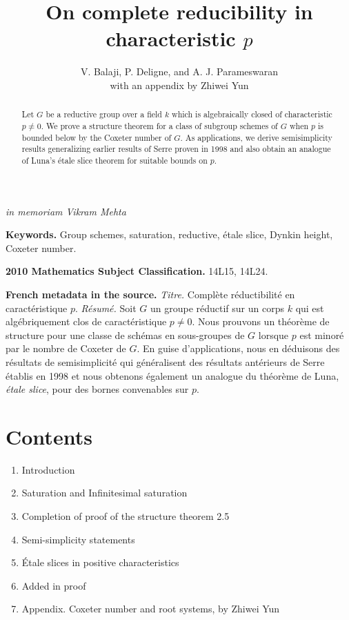 \documentclass[11pt]{article}
\title{On complete reducibility in characteristic \(p\)}
\author{V. Balaji, P. Deligne, and A. J. Parameswaran\\
\large with an appendix by Zhiwei Yun}
\date{}
\begin{document}
\maketitle

\begin{center}
\emph{in memoriam Vikram Mehta}
\end{center}

\begin{abstract}
Let \(G\) be a reductive group over a field \(k\) which is algebraically closed of characteristic
\(p\ne 0\). We prove a structure theorem for a class of subgroup schemes of \(G\) when \(p\)
is bounded below by the Coxeter number of \(G\). As applications, we derive semisimplicity
results generalizing earlier results of Serre proven in 1998 and also obtain an analogue of
Luna's étale slice theorem for suitable bounds on \(p\).
\end{abstract}

\noindent\textbf{Keywords.} Group schemes, saturation, reductive, étale slice, Dynkin height, Coxeter number.

\noindent\textbf{2010 Mathematics Subject Classification.} 14L15, 14L24.

\medskip
\noindent\textbf{French metadata in the source.}
\emph{Titre.} Complète réductibilité en caractéristique \(p\).
\emph{Résumé.} Soit \(G\) un groupe réductif sur un corps \(k\) qui est algébriquement clos de
caractéristique \(p\ne 0\). Nous prouvons un théorème de structure pour une classe de schémas
en sous-groupes de \(G\) lorsque \(p\) est minoré par le nombre de Coxeter de \(G\). En guise
d'applications, nous en déduisons des résultats de semisimplicité qui généralisent des résultats
antérieurs de Serre établis en 1998 et nous obtenons également un analogue du théorème de
Luna, \emph{étale slice}, pour des bornes convenables sur \(p\).

\section*{Contents}
\begin{enumerate}[leftmargin=2em,label=\arabic*.]
\item Introduction
\item Saturation and Infinitesimal saturation
\item Completion of proof of the structure theorem 2.5
\item Semi-simplicity statements
\item Étale slices in positive characteristics
\item Added in proof
\item Appendix. Coxeter number and root systems, by Zhiwei Yun
\end{enumerate}
\end{document}
